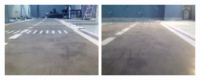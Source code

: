  \begin{figure}%
 \center
 \begin{minipage}[t]{0.3\linewidth}
\includegraphics[width=\textwidth]{images/Learningprocess/1.jpg}
 \end{minipage}
\begin{minipage}[t]{0.3\linewidth}
\includegraphics[width=\textwidth]{images/Learningprocess/2.jpg}
\end{minipage}
	\begin{minipage}[t]{0.3\linewidth}

\end{minipage}
\end{figure}
